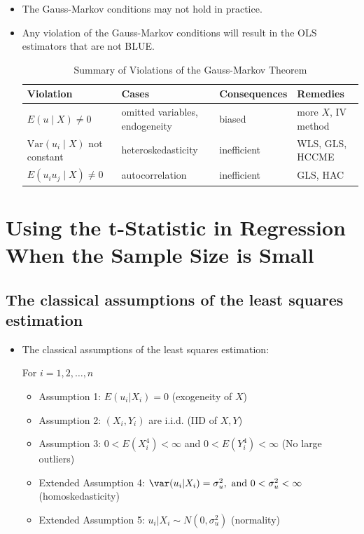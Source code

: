 \documentclass[presentation]{beamer}
\begin{document}
\begin{itemize}
\item The Gauss-Markov conditions may not hold in practice.

\item Any violation of the Gauss-Markov conditions will result in the OLS
estimators that are not BLUE.

\begin{table}[htbp]
\caption{Summary of Violations of the Gauss-Markov Theorem}
\centering
\small
\begin{tabular}{p{4cm}|p{5.5cm}|p{2.5cm}|p{3.4cm}}
\toprule
Violation & Cases & Consequences & Remedies\\
\midrule
\(E(u \mid X) \neq 0\) & omitted variables, endogeneity & biased & more \(X\), IV method\\
\(\mathrm{Var}(u_i\mid X)\) not constant & heteroskedasticity & inefficient & WLS, GLS, HCCME\\
\(E(u_{i}u_{j}\mid X) \neq 0\) & autocorrelation & inefficient & GLS, HAC\\
\bottomrule
\end{tabular}
\end{table}
\end{itemize}



\section*{Using the t-Statistic in Regression When the Sample Size is Small}
\label{sec:orga798250}

\subsection*{The classical assumptions of the least squares estimation}
\label{sec:org58ce979}

\begin{itemize}
\item The classical assumptions of the least squares estimation:

For \(i = 1, 2, \ldots, n\)
\begin{itemize}
\item Assumption 1: \(E(u_i | X_i) = 0\) (exogeneity of \(X\))
\item Assumption 2: \((X_i, Y_i)\) are i.i.d. (IID of \(X, Y\))
\item Assumption 3: \(0 < E(X_i^4) < \infty\) and \(0 < E(Y_i^4) < \infty\)
(No large outliers)
\item Extended Assumption 4: \(\var(u_i | X_i) = \sigma^2_u, \text{ and } 0 <
                     \sigma^2_u < \infty\) (homoskedasticity)
\item Extended Assumption 5: \(u_i | X_i \sim N(0, \sigma^2_u)\) (normality)
\end{itemize}
\end{itemize}
\end{document}
